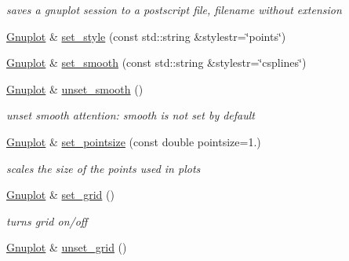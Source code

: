 \begin{DoxyCompactItemize}
\begin{DoxyCompactList}\small\item\em saves a gnuplot session to a postscript file, filename without extension \end{DoxyCompactList}\item 
\hyperlink{class_gnuplot}{Gnuplot} \& \hyperlink{class_gnuplot_acfdcda292650775ebed4683e8e1515b5}{set\+\_\+style} (const std\+::string \&stylestr=\char`\"{}points\char`\"{})
\item 
\hyperlink{class_gnuplot}{Gnuplot} \& \hyperlink{class_gnuplot_aa18386919da2ec4c994f1f9c7195d384}{set\+\_\+smooth} (const std\+::string \&stylestr=\char`\"{}csplines\char`\"{})
\item 
\hyperlink{class_gnuplot}{Gnuplot} \& \hyperlink{class_gnuplot_ad9dfbccd66dece1dbe5803605c6ab08c}{unset\+\_\+smooth} ()
\begin{DoxyCompactList}\small\item\em unset smooth attention\+: smooth is not set by default \end{DoxyCompactList}\item 
\hyperlink{class_gnuplot}{Gnuplot} \& \hyperlink{class_gnuplot_a95ec1636a871447dfe99463b769339c7}{set\+\_\+pointsize} (const double pointsize=1.)\hypertarget{class_gnuplot_a95ec1636a871447dfe99463b769339c7}{}\label{class_gnuplot_a95ec1636a871447dfe99463b769339c7}

\begin{DoxyCompactList}\small\item\em scales the size of the points used in plots \end{DoxyCompactList}\item 
\hyperlink{class_gnuplot}{Gnuplot} \& \hyperlink{class_gnuplot_a5416c8e81f1b9945b9631fa85a8d4f47}{set\+\_\+grid} ()\hypertarget{class_gnuplot_a5416c8e81f1b9945b9631fa85a8d4f47}{}\label{class_gnuplot_a5416c8e81f1b9945b9631fa85a8d4f47}

\begin{DoxyCompactList}\small\item\em turns grid on/off \end{DoxyCompactList}\item 
\hyperlink{class_gnuplot}{Gnuplot} \& \hyperlink{class_gnuplot_a53183e1487bc6977f0d46bf75d19b4d3}{unset\+\_\+grid} ()\hypertarget{class_gnuplot_a53183e1487bc6977f0d46bf75d19b4d3}{}\label{class_gnuplot_a53183e1487bc6977f0d46bf75d19b4d3}


\end{DoxyCompactItemize}
